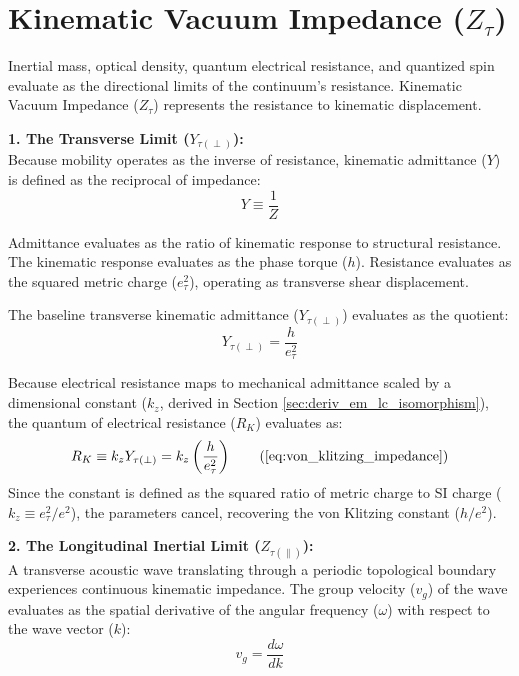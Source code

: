 
\section{Kinematic Vacuum Impedance ($Z_{\tau}$)}
\label{sec:deriv_universal_impedance}

Inertial mass, optical density, quantum electrical resistance, and quantized spin evaluate as the directional limits of the continuum's resistance. Kinematic Vacuum Impedance ($Z_\tau$) represents the resistance to kinematic displacement. 

\vspace{0.2 cm}


\textbf{1. The Transverse Limit ($Y_{\tau(\perp)}$):} \\
Because mobility operates as the inverse of resistance, kinematic admittance ($Y$) is defined as the reciprocal of impedance:
\begin{equation}
    Y \equiv \frac{1}{Z}
\end{equation}

Admittance evaluates as the ratio of kinematic response to structural resistance. The kinematic response evaluates as the phase torque ($h$). Resistance evaluates as the squared metric charge ($e_\tau^2$), operating as transverse shear displacement.

The baseline transverse kinematic admittance ($Y_{\tau(\perp)}$) evaluates as the quotient: 
\begin{equation}
    Y_{\tau(\perp)} = \frac{h}{e_\tau^2} 
\end{equation}

Because electrical resistance maps to mechanical admittance scaled by a dimensional constant ($k_z$, derived in Section \ref{sec:deriv_em_lc_isomorphism}), the quantum of electrical resistance ($R_K$) evaluates as:
\begin{equation}
    R_K \equiv k_z Y_{\tau(\perp)} = k_z \left(\frac{h}{e_\tau^2}\right) \tag{\ref{eq:von_klitzing_impedance}}
\end{equation}
Since the constant is defined as the squared ratio of metric charge to SI charge ($k_z \equiv e_\tau^2 / e^2$), the parameters cancel, recovering the von Klitzing constant ($h/e^2$).


\vspace{0.2 cm}

\textbf{2. The Longitudinal Inertial Limit ($Z_{\tau(\parallel)}$):} \\
A transverse acoustic wave translating through a periodic topological boundary experiences continuous kinematic impedance. The group velocity ($v_g$) of the wave evaluates as the spatial derivative of the angular frequency ($\omega$) with respect to the wave vector ($k$): 
\begin{equation}
    v_g = \frac{d\omega}{dk} 
\end{equation}

